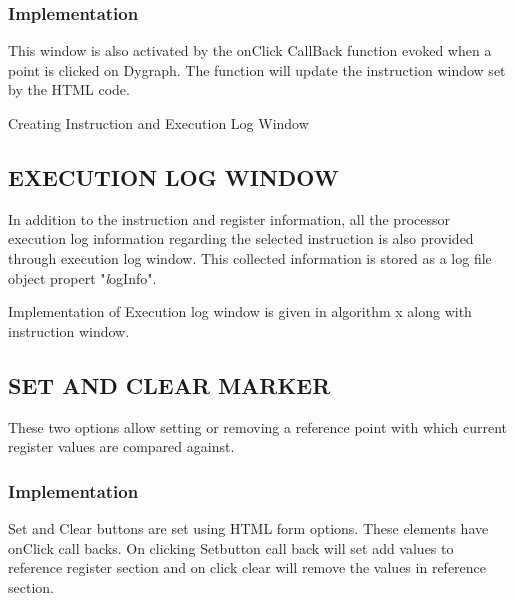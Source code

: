 \subsubsection{Implementation}

This window is also activated by the onClick CallBack function evoked when a point is clicked on Dygraph. The function will update the instruction window set by the HTML code.

\IncMargin{1em}
\begin{algorithm}[h]
\DontPrintSemicolon
{} 
\caption{Creating Instruction and Execution Log Window}
\end{algorithm}\DecMargin{1em}

\subsection {EXECUTION LOG WINDOW}

In addition to the instruction and register information, all the processor execution log information regarding the selected
instruction is also provided through execution log window.  This collected information is stored as a log file object propert "{\emph logInfo}". 

Implementation of Execution log window is given in algorithm x along with instruction window.

\subsection{SET AND CLEAR MARKER}
These two options allow setting or removing a reference point with which current register values are compared against.

\subsubsection{Implementation}

Set and Clear buttons are set using HTML form options. These elements have onClick call backs. On clicking Setbutton call back will set add values to reference register section and on click clear will remove the values in reference section.



